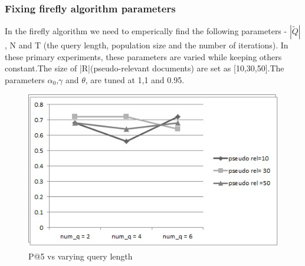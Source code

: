 \documentclass{nitk}
\begin{document}
 \subsubsection{Fixing firefly algorithm parameters}
 In the firefly algorithm we need to emperically find the following parameters - $|\tilde{Q}|$, N and T (the query length, population size and the number of iterations).
 In these primary experiments, these parameters are varied while keeping others constant.The size of |R|(pseudo-relevant documents)  are set as [10,30,50].The parameters $\alpha_0$,$\gamma$ and $\theta$, are tuned at 1,1 and 0.95.
 \begin{figure}[!htb]
 \centering
 \includegraphics[scale=0.5]{query_length_p_5}
 \caption{P@5 vs varying query length}
 \label{fig:quer_leng_p} 
 \end{figure}
 
\end{document}
